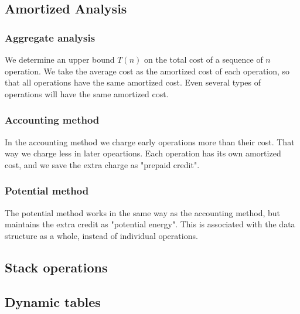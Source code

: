 \subsection*{Amortized Analysis}

\subsubsection*{Aggregate analysis}
We determine an upper bound $T(n)$ on the total cost of a sequence of $n$
operation. We take the average cost as the amortized cost of each operation, so
that all operations have the same amortized cost. Even several types of
operations will have the same amortized cost.

\subsubsection*{Accounting method}
In the accounting method we charge early operations more than their cost. That
way we charge less in later opeartions. Each operation has its own amortized
cost, and we save the extra charge as "prepaid credit".

\subsubsection*{Potential method}
The potential method works in the same way as the accounting method, but
maintains the extra credit as "potential energy". This is associated with the
data structure as a whole, instead of individual operations.

\subsection*{Stack operations}


\subsection*{Dynamic tables}
